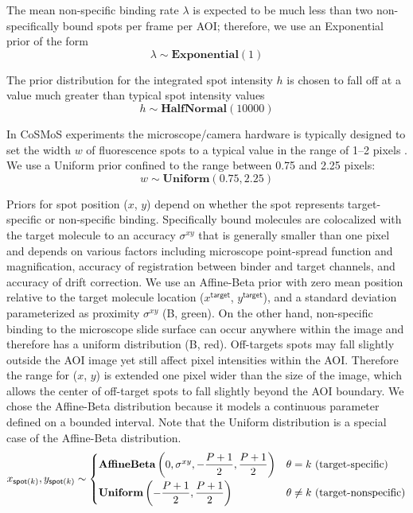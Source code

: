The mean non-specific binding rate $\lambda$ is expected to be much less than two non-specifically bound spots per frame per AOI; therefore, we use an Exponential prior of the form
%
\begin{equation}
    \lambda \sim \mathbf{Exponential}(1)
\end{equation}

The prior distribution for the integrated spot intensity $h$ is chosen to fall off at a value much greater than typical spot intensity values 
%
\begin{equation}
    h \sim \mathbf{HalfNormal}(10000)
\end{equation}

In CoSMoS experiments the microscope/camera hardware is typically designed to set the width $w$ of fluorescence spots to a  typical value in the range of 1--2 pixels \citep{Ober2015-ba}. We use a Uniform prior confined to the range between 0.75 and 2.25 pixels:
%
\begin{equation}
    w \sim \mathbf{Uniform}(0.75, 2.25)
\end{equation}

Priors for spot position ($x$, $y$) depend on whether the spot represents target-specific or non-specific binding. Specifically bound molecules are colocalized with the target molecule to an accuracy $\sigma^{xy}$ that is generally smaller than one pixel and depends on various factors including microscope point-spread function and magnification, accuracy of registration between binder and target channels, and accuracy of drift correction. We use an Affine-Beta prior with zero mean position relative to the target molecule location ($x^\mathsf{target}$, $y^\mathsf{target}$), and a standard deviation parameterized as proximity $\sigma^{xy} $ (B, green). On the other hand, non-specific binding to the microscope slide surface can occur anywhere within the image and therefore has a uniform distribution (B, red).  Off-targets spots may fall slightly outside the AOI image yet still affect pixel intensities within the AOI.  Therefore the range for ($x$, $y$) is extended one pixel wider than the size of the image, which allows the center of off-target spots to fall slightly beyond the AOI boundary. We chose the Affine-Beta distribution because it models a continuous parameter defined on a bounded interval. Note that the Uniform distribution is a special case of the Affine-Beta distribution.
%
\begin{equation}
    x_{\mathsf{spot}(k)}, y_{\mathsf{spot}(k)} \sim
    \begin{cases}
        \mathbf{AffineBeta}\left( 0, \sigma^{xy}, -\dfrac{P+1}{2}, \dfrac{P+1}{2} \right) & \theta = k ~\textrm{(target-specific)} \\
        \mathbf{Uniform}\left(-\dfrac{P+1}{2}, \dfrac{P+1}{2} \right) & \theta \neq k ~\text{(target-nonspecific)} \rule{0pt}{4ex}
    \end{cases}
\end{equation}

